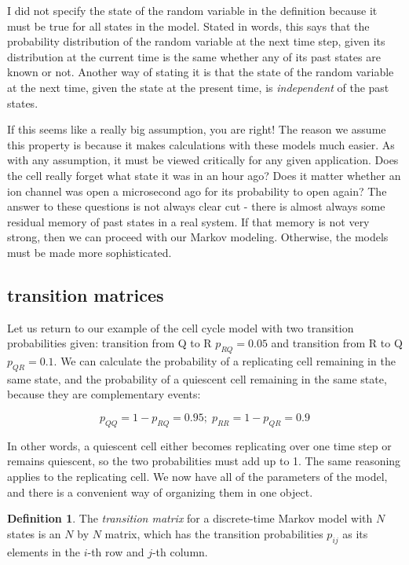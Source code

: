 \documentclass[
]{book}
\theoremstyle{definition}
\newtheorem{definition}{Definition}[chapter]
\theoremstyle{definition}
\theoremstyle{definition}
\theoremstyle{remark}
\begin{document}
I did not specify the state of the random variable in the definition because it must be true for all states in the model. Stated in words, this says that the probability distribution of the random variable at the next time step, given its distribution at the current time is the same whether any of its past states are known or not. Another way of stating it is that the state of the random variable at the next time, given the state at the present time, is \emph{independent} of the past states.

If this seems like a really big assumption, you are right! The reason we assume this property is because it makes calculations with these models much easier. As with any assumption, it must be viewed critically for any given application. Does the cell really forget what state it was in an hour ago? Does it matter whether an ion channel was open a microsecond ago for its probability to open again? The answer to these questions is not always clear cut - there is almost always some residual memory of past states in a real system. If that memory is not very strong, then we can proceed with our Markov modeling. Otherwise, the models must be made more sophisticated.

\hypertarget{transition-matrices}{%
\subsection{transition matrices}\label{transition-matrices}}

Let us return to our example of the cell cycle model with two transition probabilities given: transition from Q to R \(p_{RQ} = 0.05\) and transition from R to Q \(p_{QR} = 0.1\). We can calculate the probability of a replicating cell remaining in the same state, and the probability of a quiescent cell remaining in the same state, because they are complementary events:

\[
p_{QQ} = 1 - p_{RQ} = 0.95; \; p_{RR} = 1 - p_{QR} = 0.9
\]

In other words, a quiescent cell either becomes replicating over one time step or remains quiescent, so the two probabilities must add up to 1. The same reasoning applies to the replicating cell. We now have all of the parameters of the model, and there is a convenient way of organizing them in one object.

\begin{definition}
\protect\hypertarget{def:def-trans-mat}{}{\label{def:def-trans-mat} }The \emph{transition matrix} for a discrete-time Markov model with \(N\) states is an \(N\) by \(N\) matrix, which has the transition probabilities \(p_{ij}\) as its elements in the \(i\)-th row and \(j\)-th column.
\end{definition}
\end{document}
